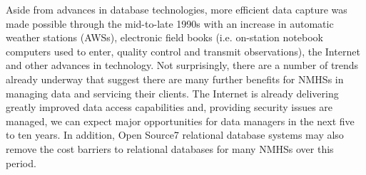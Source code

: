 Aside from advances in database technologies, more efficient data capture was made possible
through the mid-to-late 1990s with an increase in automatic weather stations (AWSs), electronic
field books (i.e. on-station notebook computers used to enter, quality control and transmit
observations), the Internet and other advances in technology.
Not surprisingly, there are a number of trends already underway that suggest there are many
further benefits for NMHSs in managing data and servicing their clients. The Internet is already
delivering greatly improved data access capabilities and, providing security issues are managed,
we can expect major opportunities for data managers in the next five to ten years. In addition,
Open Source7 relational database systems may also remove the cost barriers to relational
databases for many NMHSs over this period.